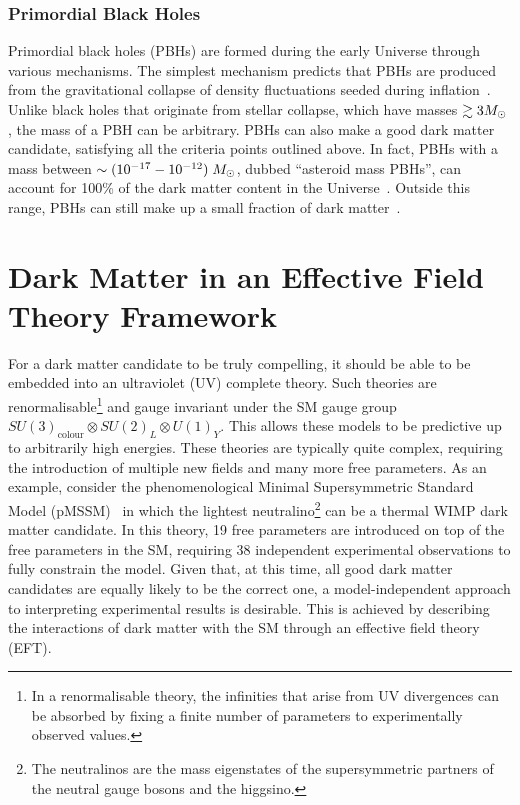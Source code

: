 \subsubsection*{Primordial Black Holes}

Primordial black holes (PBHs) are formed during the early Universe through various mechanisms. The simplest mechanism predicts that PBHs are produced from the gravitational collapse of density fluctuations seeded during inflation~\cite{Hawking:1971ei_apr_Gravitationallycollapsedobjects, Carr:1974nx_Blackholesearly,Carr:1975qj_Primordialblackhole}. 
Unlike black holes that originate from stellar collapse, which have masses $\gtrsim 3M_\odot$, the mass of a PBH can be arbitrary.  PBHs can also make a good dark matter candidate, satisfying all the criteria points outlined above. In fact, PBHs with a mass between $\sim (10^{-17} - 10^{-12})\;M_\odot$, dubbed ``asteroid mass PBHs'', can account for 100\% of the dark matter content in the Universe~\cite{Montero-Camacho:2019jte_aug_Revisitingconstraintsasteroidmass}. Outside this range, PBHs can still make up a small fraction of dark matter~\cite{Villanueva-Domingo:2021spv_may_Briefreviewprimordial}. 

\section{Dark Matter in an Effective Field Theory Framework}
\label{ch1:subsec:DM_EFTs}

For a dark matter candidate to be truly compelling, it should be able to be embedded into an ultraviolet (UV) complete theory. Such theories are renormalisable\footnote{In a renormalisable theory, the infinities that arise from UV divergences can be absorbed by fixing a finite number of parameters to experimentally observed values.} and gauge invariant under the SM gauge group $SU(3)_\mathrm{colour}\otimes SU(2)_L\otimes U(1)_Y$. This allows these models to be predictive up to arbitrarily high energies. These theories are typically quite complex, requiring the introduction of multiple new fields and many more free parameters. As an example, consider the phenomenological Minimal Supersymmetric Standard Model (pMSSM)~\cite{Villanueva-Domingo:2021spv_may_Briefreviewprimordial} in which the lightest neutralino\footnote{The neutralinos are the mass eigenstates of the supersymmetric partners of the neutral gauge bosons and the higgsino.} can be a thermal WIMP dark matter candidate. In this theory, 19 free parameters are introduced on top of the free parameters in the SM, requiring 38 independent experimental observations to fully constrain the model. Given that, at this time, all good dark matter candidates are equally likely to be the correct one, a model-independent approach to interpreting experimental results is desirable. This is achieved by describing the interactions of dark matter with the SM through an effective field theory (EFT).

